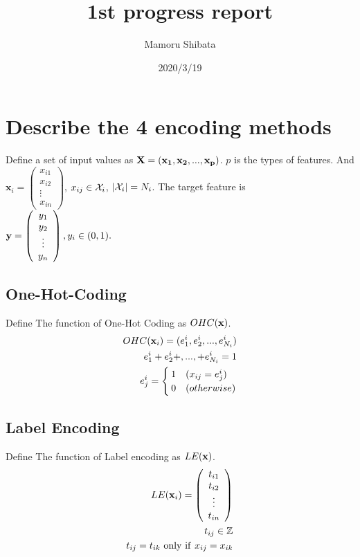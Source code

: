 \documentclass[twocolumn,9pt,a4j]{jarticle}
\title{1st progress report}
\author{Mamoru Shibata}
\date{2020/3/19}
\begin{document}
  \maketitle

  \section{Describe the 4 encoding methods}
  	Define a set of input values as ${\bf X=(x_1, x_2, ...,x_p)}$. $p$ is the types of features. And ${\bm x}_i = \left(
		\begin{array}{c}
			x_{i1}\\
			x_{i2}\\
			\vdots \\
			x_{in}
		\end{array}
	\right)$, $x_{ij} \in {\cal{X}}_{i}$, $|{\cal X}_i| = N_i$. The target feature is ${\bf y} =  \left(
		\begin{array}{c}
			y_{1}\\
			y_{2}\\
			\vdots \\
			y_{n}
		\end{array}
	\right), y_i \in (0, 1).
	$
  	\subsection{One-Hot-Coding}
		Define The function of One-Hot Coding as $OHC({\bf x})$.
		\begin{eqnarray}
			OHC({\bf x}_i) = (e_1^i, e_2^i, ... , e_{N_i}^i)\\
			e_1^i + e_2^i + ,..., + e_{N_i}^i = 1\\
			e_j^i = \begin{cases}
				1 & (x_{ij} = e_j^i)\\
				0 & (otherwise)
			\end{cases}
		\end{eqnarray}
	\subsection{Label Encoding}
		Define The function of Label encoding as $LE({\bf x})$.
		\begin{eqnarray}
			LE({\bf x}_i) = \left(
				\begin{array}{c}
					t_{i1}\\
					t_{i2}\\
					\vdots\\
					t_{in}
				\end{array}
			\right)\\
			t_{ij} \in \mathbb{Z}\\
			t_{ij} = t_{ik}\  {\rm only\  if\ } x_{ij} = x_{ik}
		\end{eqnarray}
\end{document}
